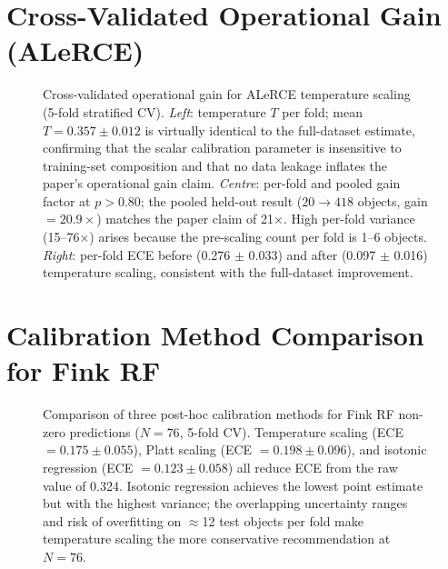 \documentclass[twocolumn]{aastex631}
\begin{document}





\appendix

\section{Cross-Validated Operational Gain (ALeRCE)}\label{app:cv}

\begin{figure}
\caption{Cross-validated operational gain for ALeRCE temperature scaling (5-fold stratified CV). \emph{Left}: temperature $T$ per fold; mean $T = 0.357 \pm 0.012$ is virtually identical to the full-dataset estimate, confirming that the scalar calibration parameter is insensitive to training-set composition and that no data leakage inflates the paper's operational gain claim. \emph{Centre}: per-fold and pooled gain factor at $p > 0.80$; the pooled held-out result ($20 \to 418$ objects, gain $= 20.9\times$) matches the paper claim of 21$\times$. High per-fold variance (15--76$\times$) arises because the pre-scaling count per fold is 1--6 objects. \emph{Right}: per-fold ECE before (0.276 $\pm$ 0.033) and after (0.097 $\pm$ 0.016) temperature scaling, consistent with the full-dataset improvement. \label{fig:alerce_cv}}
\end{figure}


\section{Calibration Method Comparison for Fink RF}\label{app:methods}

\begin{figure}
\caption{Comparison of three post-hoc calibration methods for Fink RF non-zero predictions ($N = 76$, 5-fold CV). Temperature scaling (ECE $= 0.175 \pm 0.055$), Platt scaling (ECE $= 0.198 \pm 0.096$), and isotonic regression (ECE $= 0.123 \pm 0.058$) all reduce ECE from the raw value of 0.324. Isotonic regression achieves the lowest point estimate but with the highest variance; the overlapping uncertainty ranges and risk of overfitting on $\approx$12 test objects per fold make temperature scaling the more conservative recommendation at $N = 76$. \label{fig:fink_methods}}
\end{figure}
\end{document}
